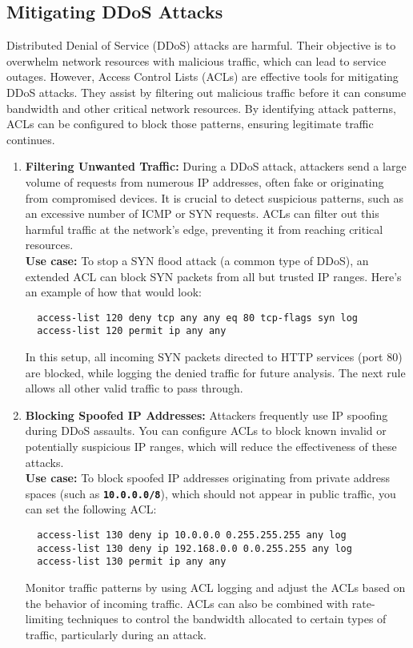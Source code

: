 \documentclass[11pt,a4paper]{article}
\begin{document}
    \subsection*{Mitigating DDoS Attacks}
    Distributed Denial of Service (DDoS) attacks are harmful. Their objective is to overwhelm network resources with malicious traffic, which can lead to service outages. However, Access Control Lists (ACLs) are effective tools for mitigating DDoS attacks. They assist by filtering out malicious traffic before it can consume bandwidth and other critical network resources. By identifying attack patterns, ACLs can be configured to block those patterns, ensuring legitimate traffic continues.
    \begin{enumerate}
        \item \textbf{Filtering Unwanted Traffic:} During a DDoS attack, attackers send a large volume of requests from numerous IP addresses, often fake or originating from compromised devices. It is crucial to detect suspicious patterns, such as an excessive number of ICMP or SYN requests. ACLs can filter out this harmful traffic at the network's edge, preventing it from reaching critical resources.
        \\[1em]
        \textbf{Use case:} To stop a SYN flood attack (a common type of DDoS), an extended ACL can block SYN packets from all but trusted IP ranges. Here’s an example of how that would look:
\begin{lstlisting}
  access-list 120 deny tcp any any eq 80 tcp-flags syn log
  access-list 120 permit ip any any                                      
\end{lstlisting}
        In this setup, all incoming SYN packets directed to HTTP services (port 80) are blocked, while logging the denied traffic for future analysis. The next rule allows all other valid traffic to pass through.

        \item \textbf{Blocking Spoofed IP Addresses:} Attackers frequently use IP spoofing during DDoS assaults. You can configure ACLs to block known invalid or potentially suspicious IP ranges, which will reduce the effectiveness of these attacks.
        \\[1em]
        \textbf{Use case:} To block spoofed IP addresses originating from private address spaces (such as \textbf{\lstinline{10.0.0.0/8}}), which should not appear in public traffic, you can set the following ACL:
\begin{lstlisting}
  access-list 130 deny ip 10.0.0.0 0.255.255.255 any log
  access-list 130 deny ip 192.168.0.0 0.0.255.255 any log
  access-list 130 permit ip any any                                                 
\end{lstlisting}
        Monitor traffic patterns by using ACL logging and adjust the ACLs based on the behavior of incoming traffic. ACLs can also be combined with rate-limiting techniques to control the bandwidth allocated to certain types of traffic, particularly during an attack.

    \end{enumerate}
\end{document}
